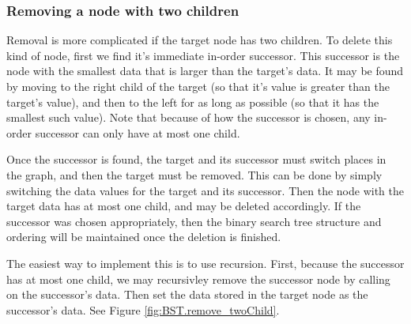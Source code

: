 \subsubsection*{Removing a node with two children}

Removal is more complicated if the target node has two children.
To delete this kind of node, first we find it's immediate in-order successor.
This successor is the node with the smallest data that is larger than the target's data.
It may be found by moving to the right child of the target (so that it's value is greater than the target's value), and then to the left for as long as possible (so that it has the smallest such value).
Note that because of how the successor is chosen, any in-order successor can only have at most one child.

Once the successor is found, the target and its successor must switch places in the graph, and then the target must be removed.
This can be done by simply switching the data values for the target and its successor.
Then the node with the target data has at most one child, and may be deleted accordingly.
If the successor was chosen appropriately, then the binary search tree structure and ordering will be maintained once the deletion is finished.

The easiest way to implement this is to use recursion.
First, because the successor has at most one child, we may recursivley remove the successor node by calling  on the successor's data.
Then set the data stored in the target node as the successor's data.
See Figure \ref{fig:BST.remove_twoChild}.

